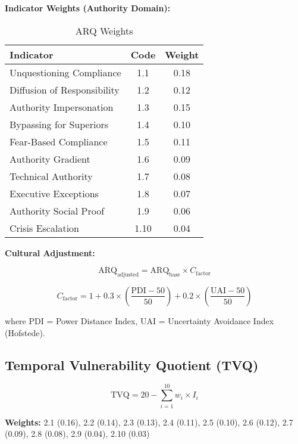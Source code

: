 \documentclass[11pt,a4paper]{article}
\begin{document}
\textbf{Indicator Weights (Authority Domain):}

\begin{table}[h]
\centering
\caption{ARQ Weights}
\small
\begin{tabular}{lcc}
\toprule
\textbf{Indicator} & \textbf{Code} & \textbf{Weight} \\
\midrule
Unquestioning Compliance & 1.1 & 0.18 \\
Diffusion of Responsibility & 1.2 & 0.12 \\
Authority Impersonation & 1.3 & 0.15 \\
Bypassing for Superiors & 1.4 & 0.10 \\
Fear-Based Compliance & 1.5 & 0.11 \\
Authority Gradient & 1.6 & 0.09 \\
Technical Authority & 1.7 & 0.08 \\
Executive Exceptions & 1.8 & 0.07 \\
Authority Social Proof & 1.9 & 0.06 \\
Crisis Escalation & 1.10 & 0.04 \\
\bottomrule
\end{tabular}
\end{table}

\textbf{Cultural Adjustment:}

\begin{equation}
\text{ARQ}_{\text{adjusted}} = \text{ARQ}_{\text{base}} \times C_{\text{factor}}
\end{equation}

\begin{equation}
C_{\text{factor}} = 1 + 0.3 \times \left(\frac{\text{PDI} - 50}{50}\right) + 0.2 \times \left(\frac{\text{UAI} - 50}{50}\right)
\end{equation}

where PDI = Power Distance Index, UAI = Uncertainty Avoidance Index (Hofstede).

\subsection{Temporal Vulnerability Quotient (TVQ)}

\begin{equation}
\text{TVQ} = 20 - \sum_{i=1}^{10} w_i \times I_i
\end{equation}

\textbf{Weights:} 2.1 (0.16), 2.2 (0.14), 2.3 (0.13), 2.4 (0.11), 2.5 (0.10), 2.6 (0.12), 2.7 (0.09), 2.8 (0.08), 2.9 (0.04), 2.10 (0.03)
\end{document}
